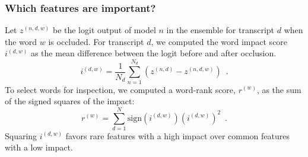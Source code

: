 \begin{frame}
    \frametitle{Which features are important?}
    Let $z^{(n, d, w)}$ be the logit output of model $n$ in the ensemble for transcript $d$ when the word $w$ is occluded. For transcript $d$, we computed the word impact score $i^{(d, w)}$ as the mean difference between the logit before and after occlusion.
    \begin{equation}
        i^{(d,w)} = \frac{1}{N_d} \sum_{n=1}^{N_d} \left( z^{(n, d)} - z^{(n, d, w)} \right) \enspace .
    \end{equation}
    To select words for inspection, we computed a word-rank score, $r^{(w)}$, as the sum of the signed squares of the impact:
    \begin{equation}
        r^{(w)} = \sum_{d=1}^{N} \text{sign}\left( i^{(d, w)} \right) \left( i^{(d,w)}\right) ^2 \enspace .
    \end{equation}
    Squaring $i^{(d,w)}$ favors rare features with a high impact over common features with a low impact.
\end{frame}


